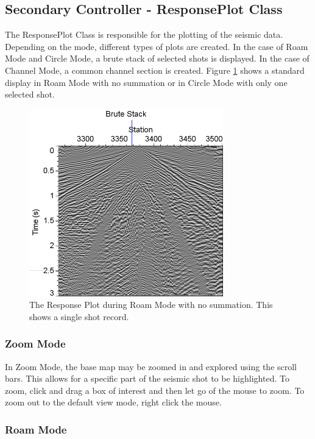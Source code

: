 \documentclass[12pt]{article}
\begin{document}
\subsection{Secondary Controller - ResponsePlot Class}

The ResponsePlot Class is responsible for the plotting of the seismic data. Depending on the mode, different types of plots are created.  In the case of Roam Mode and Circle Mode, a brute stack of selected shots is displayed. In the case of Channel Mode, a common channel section is created. Figure \ref{FIG:RP} shows a standard display in Roam Mode with no summation or in Circle Mode with only one selected shot.

\begin{figure}[H]
\centering
\includegraphics[width=0.75\textwidth]{./figs/fig4.png}
\caption{The Response Plot during Roam Mode with no summation. This shows a single shot record.}
\label{FIG:RP}
\end{figure}

\subsubsection{Zoom Mode}

In Zoom Mode, the base map may be zoomed in and explored using the scroll bars. This allows for a specific part of the seismic shot to be highlighted. To zoom, click and drag a box of interest and then let go of the mouse to zoom. To zoom out to the default view mode, right click the mouse. 

\subsubsection{Roam Mode}
\end{document}
